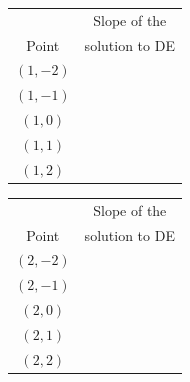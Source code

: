 \documentclass[12pt]{article}
\newcommand{\<}{\langle}
\renewcommand{\>}{\rangle}
\begin{document}
\begin{enumerate}
\begin{center}
			\begin{tabular}{|c|c|}
				\hline
							& Slope of the	\\
				Point	& solution to DE\\
				\hline
				\hline
				$(1, -2)$	& \\
				\hline
				$(1, -1)$	& \\
				\hline
				$(1, 0)$	& \\
				\hline
				$(1, 1)$	& \\
				\hline
				$(1, 2)$	& \\
				\hline
			\end{tabular}	
			\hspace{0.5cm}
			\begin{tabular}{|c|c|}
				\hline
							& Slope of the	\\
				Point	& solution to DE\\
				\hline
				\hline
				$(2, -2)$	& \\
				\hline
				$(2, -1)$	& \\
				\hline
				$(2, 0)$	& \\
				\hline
				$(2, 1)$	& \\
				\hline
				$(2, 2)$	& \\
				\hline
			\end{tabular}
		\end{center}
		

\end{enumerate}
\end{document}
